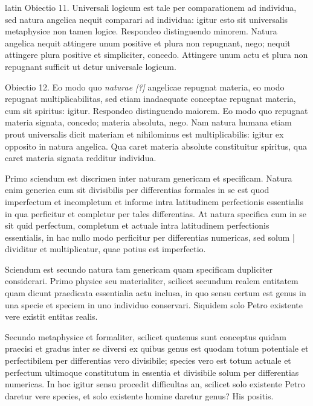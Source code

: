 \begin{otherlanguage*}{latin}
\pstart
 Obiectio 11. Universali logicum est tale per comparationem ad individua, sed natura angelica nequit comparari ad individua: igitur esto sit universalis metaphysice non tamen logice. Respondeo distinguendo minorem. Natura angelica nequit attingere unum positive et plura non repugnant, nego; nequit attingere plura positive et simpliciter, concedo. Attingere unum actu et plura non repugnant sufficit ut detur universale logicum. 
\pend

\pstart
 Obiectio 12. Eo modo quo \emph{naturae [?]} angelicae repugnat materia, eo modo repugnat multiplicabilitas, sed etiam inadaequate conceptae repugnat materia, cum sit spiritus: igitur. Respondeo distinguendo maiorem. Eo modo quo repugnat materia signata, concedo; materia absoluta, nego. Nam natura humana etiam prout universalis dicit materiam et nihilominus est multiplicabilis: igitur ex opposito in natura angelica. Qua caret materia absolute constituitur spiritus, qua caret materia signata redditur individua. 
\pend

        \pstart
        \pend
      
\pstart
 Primo sciendum est discrimen inter naturam genericam et specificam. Natura enim generica cum sit divisibilis per differentias formales in se est quod imperfectum et incompletum et informe intra latitudinem perfectionis essentialis in qua perficitur et completur per tales differentias. At natura specifica cum in se sit quid perfectum, completum et actuale intra latitudinem perfectionis essentialis, in hac nullo modo perficitur per differentias numericas, sed solum \textnormal{|} dividitur et multiplicatur, quae potius est imperfectio. 
\pend

\pstart
 Sciendum est secundo natura tam genericam quam specificam dupliciter considerari. Primo physice seu materialiter, scilicet secundum realem entitatem quam dicunt praedicata essentialia actu inclusa, in quo sensu certum est genus in una specie et speciem in uno individuo conservari. Siquidem solo Petro existente vere existit entitas realis. 
\pend

\pstart
 Secundo metaphysice et formaliter, scilicet quatenus sunt conceptus quidam praecisi et gradus inter se diversi ex quibus genus est quodam totum potentiale et perfectibilem per differentias vero divisibile; species vero est totum actuale et perfectum ultimoque constitutum in essentia et divisibile solum per differentias numericas. In hoc igitur sensu procedit difficultas an, scilicet solo existente Petro daretur vere species, et solo existente homine daretur genus? His positis. 
\pend


\end{otherlanguage*}
